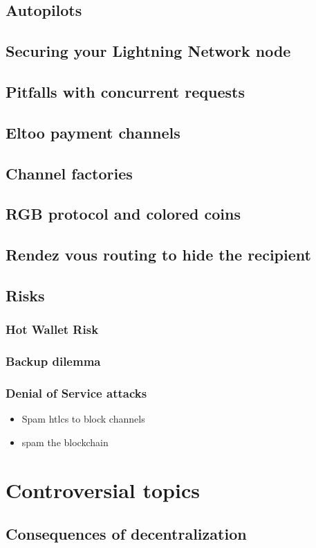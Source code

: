 \documentclass[ebook,12pt,oneside,openany]{memoir}
\begin{document}
\section{Autopilots}
\section{Securing your Lightning Network node}
\section{Pitfalls with concurrent requests}
\section{Eltoo payment channels}
\section{Channel factories}
\section{RGB protocol and colored coins}
\section{Rendez vous routing to hide the recipient}
\section{Risks}
\subsection{Hot Wallet Risk}
\subsection{Backup dilemma}
\subsection{Denial of Service attacks}
\begin{itemize}
\item Spam htlcs to block channels
\item spam the blockchain
\end{itemize}
\chapter{Controversial topics}
\section{Consequences of decentralization}
\end{document}
